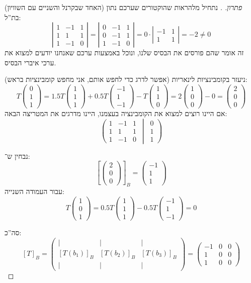 \documentclass[]{article}
\newcommand\tmat[2]   {\cl{\begin{matrix}
			#1
		\end{matrix}\, \middle\vert\, \begin{matrix}
			#2
\end{matrix}}}
\newcommand\pms[1]    {\begin{pmatrix}
		#1
\end{pmatrix}}
\newcommand\sof[1]    {\left | #1 \right |}
\newcommand\cl [1]    {\left ( #1 \right )}
\newcommand\csb[1]    {\left [ #1 \right ]}
\theoremstyle{definition}
\begin{document}
	 \begin{proof}[פתרון. ]
	 	נתחיל מלהראות שהוקטורים שערכם נתון (האחד שבקרנל והשניים עם השוויון) בת''ל: 
	 	\[ \sof{\begin{matrix}
	 			1 & -1 & 1 \\ 1 & 1 & 1 \\ 1 & - 1 & 0
		 	\end{matrix}} = \sof{\begin{matrix}
			 	0 & -1 & 1 \\ 0 & -1 & 1 \\ 1 & -1 & 0
		 	\end{matrix}} = 0 \cdot \sof{\begin{matrix}
		 		-1 & 1 \\ 1 & 1
		    \end{matrix}} = -2 \neq 0 \]
	    זה אומר שהם פורסים את הבסיס שלנו, ונוכל באמצעות ערכם שאנחנו יודעים למצוא את ערכי איברי הבסיס. 
	    
	    ניעזר בקומבינציות לינאריות (אפשר לדרג כדי לחפש אותם, אני מחפש קומבינציות בראש): 
	    \[ T\pms{0 \\ 1 \\ 1} = 1.5T\pms{1 \\ 1 \\ 1} + 0.5T\pms{-1 \\ 1 \\ -1} - T\pms{1 \\ 1 \\ 0} = 2\pms{1 \\ 0 \\ 0} - 0 = \pms{2 \\ 0 \\ 0} \]
	    אם היינו רוצים למצוא את הקומבינציה בעצמנו, היינו מדרגים את המטריצה הבאה: 
	    \[ \tmat{1 & - 1 & 1 \\ 1 & 1 & 1 \\ 1 & -1 & 0}{0 \\ 1 \\ 1} \]
	    
	    נבחין ש־: 
	    \[ \csb{\pms{2 \\ 0 \\ 0}}_B = \pms{-1 \\ 1 \\ 1} \]
	    עבור העמודה השנייה: 
	    \[ T\pms{1 \\ 0 \\ 1} = 0.5T\pms{1 \\ 1 \\ 1} - 0.5T\pms{-1 \\ 1 \\ -1} = 0 \]
	    
	    סה''כ:
	    \[ [T]_B = \pms{\vert & \vert & \vert \\ [T(b_1)]_B & [T(b_2)]_B & [T(b_3)]_B \\ \vert & \vert & \vert} = \pms{-1 & 0 & 0 \\ 1 & 0 & 0 \\ 1 & 0 & 0} \]
	 \end{proof}
	 
\end{document}
